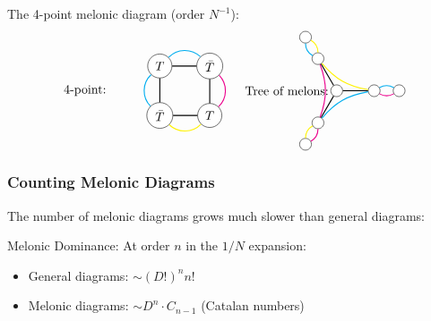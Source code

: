 The 4-point melonic diagram (order $N^{-1}$):
\[
\begin{tikzpicture}[baseline=0, scale=0.7]
   \node at (-3,0) {4-point:};
   \node[circle, draw, fill=white] (T1) at (0,1) {$T$};
   \node[circle, draw, fill=white] (T2) at (2,1) {$\bar{T}$};
   \node[circle, draw, fill=white] (T3) at (2,-1) {$T$};
   \node[circle, draw, fill=white] (T4) at (0,-1) {$\bar{T}$};
   
   \draw[thick] (T1) -- (T2) -- (T3) -- (T4) -- (T1);
   
   \draw[cyan, thick] (T1) to[bend left=45] (T2);
   \draw[magenta, thick] (T2) to[bend left=45] (T3);
   \draw[yellow, thick] (T3) to[bend left=45] (T4);
   \draw[cyan, thick] (T4) to[bend left=45] (T1);
\end{tikzpicture}
\quad
\begin{tikzpicture}[baseline=0, scale=0.7]
   \node at (-2,0) {Tree of melons:};
   \node[circle, draw, fill=white] (C) at (0,0) {};
   \foreach \i in {0,120,240} {
      \node[circle, draw, fill=white] (T\i) at (\i:1.5) {};
      \node[circle, draw, fill=white] (S\i) at (\i:2.5) {};
   }
   \foreach \i in {0,120,240} {
      \draw[thick] (C) -- (T\i);
   }
   \draw[cyan, thick] (T0) to[bend left=30] (S0);
   \draw[magenta, thick] (T0) to[bend right=30] (S0);
   \draw[cyan, thick] (T120) to[bend left=30] (S120);
   \draw[yellow, thick] (T120) to[bend right=30] (S120);
   \draw[magenta, thick] (T240) to[bend left=30] (S240);
   \draw[yellow, thick] (T240) to[bend right=30] (S240);
   \draw[yellow, thick, bend left=20] (T0) to (T120);
   \draw[magenta, thick, bend left=20] (T120) to (T240);
   \draw[cyan, thick, bend left=20] (T240) to (T0);
\end{tikzpicture}
\]

\subsubsection{Counting Melonic Diagrams}

The number of melonic diagrams grows much slower than general diagrams:

Melonic Dominance:
At order $n$ in the $1/N$ expansion:
\begin{itemize}
\item General diagrams: $\sim (D!)^n n!$ 
\item Melonic diagrams: $\sim D^n \cdot C_{n-1}$ (Catalan numbers)
\end{itemize}

